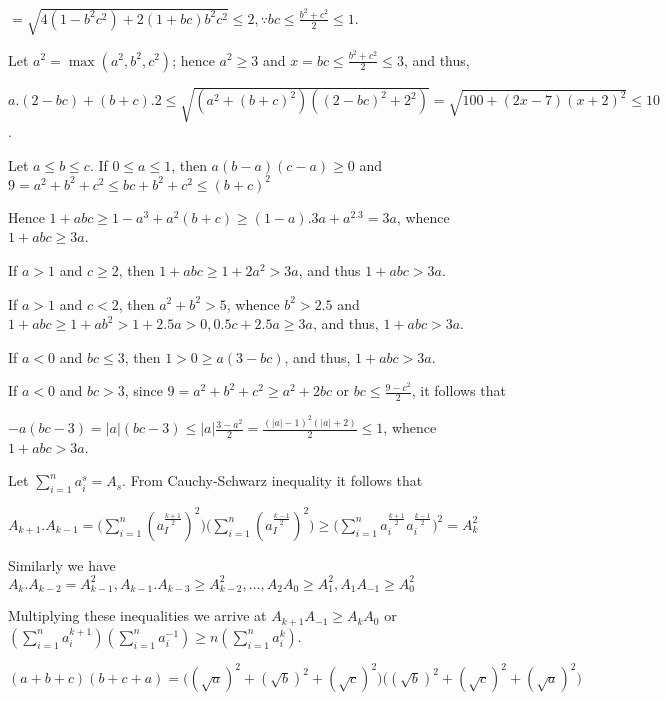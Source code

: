   $= \sqrt{4\left(1 - b^2c^2\right) + 2\left(1 + bc\right)b^2c^2}\leq 2, \because bc\leq \frac{b^2 +
  c^2}{2}\leq 1$.
\item Let $a^2 = \max(a^2, b^2, c^2)$; hence $a^2\geq 3$ and $x = bc \leq \frac{b^2 + c^2}{2}\leq 3$, and
  thus,

  $a.(2 - bc) + (b + c).2\leq \sqrt{\left(a^2 + (b + c)^2\right)\left((2 - bc)^2 + 2^2\right)} = \sqrt{100 +
    (2x - 7)(x + 2)^2}\leq 10$.
\item Let $a\leq b\leq c$. If $0\leq a\leq 1$, then $a(b - a)(c - a)\geq 0$ and $9 = a^2 + b^2 + c^2\leq bc
  + b^2 + c^2\leq (b + c)^2$

  Hence $1 + abc\geq 1 - a^3 + a^2(b + c)\geq (1 - a).3a + a^2.3 = 3a$, whence $1 + abc \geq 3a$.

  If $a > 1$ and $c\geq 2$, then $1 + abc\geq 1 + 2a^2 > 3a$, and thus $1 + abc > 3a$.

  If $a > 1$ and $c < 2$, then $a^2 + b^2 > 5$, whence $b^2 > 2.5$ and $1 + abc\geq 1 + ab^2 > 1 + 2.5a > 0,
  0.5c + 2.5a \geq 3a$, and thus, $1 + abc > 3a$.

  If $a < 0$ and $bc \leq 3$, then $1 > 0\geq a(3 - bc)$, and thus, $1 + abc > 3a$.

  If $a < 0$ and $bc > 3$, since $9 = a^2 + b^2 + c^2\geq a^2 + 2bc$ or $bc \leq \frac{9 - c^2}{2}$, it
  follows that

  $-a(bc - 3) = |a|(bc - 3)\leq |a|\frac{3 - a^2}{2} = \frac{(|a| - 1)^2(|a| + 2)}2{}\leq 1$, whence $1 +
  abc > 3a$.
\item Let $\displaystyle\sum_{i = 1}^na_i^s = A_s$. From Cauchy-Schwarz inequality it follows that

  $A_{k + 1}.A_{k - 1} = \bigl(\displaystyle\sum_{i = 1}^n\left(a_I^{\frac{k +
    1}{2}}\right)^2\bigr)\bigl(\displaystyle\sum_{i = 1}^n\left(a_I^{\frac{k -
    1}{2}}\right)^2\bigr) \geq \bigl(\sum_{i = 1}^na_i^{\frac{k + 1}{2}}a_i^{\frac{k - 1}{2}}\bigr)^2 =
  A_k^2$

  Similarly we have $A_k.A_{k - 2} = A_{k - 1}^2, A_{k - 1}.A_{k - 3}\geq A_{k - 2}^2, \ldots, A_2A_0\geq
  A_1^2, A_1A_{-1}\geq A_0^2$

  Multiplying these inequalities we arrive at $A_{k + 1}A_{-1}\geq A_kA_0$ or
  $\displaystyle\left(\sum_{i=1}^na_i^{k + 1}\right)\left(\sum_{i=1}^na_i^{-1}\right)\geq
  n\left(\sum_{i=1}^na_i^k\right)$.
\item $(a + b + c)(b + c + a) = \bigl(\left(\sqrt{a}\right)^2 + \left(\sqrt{b}\right)^2
  + \left(\sqrt{c}\right)^2\bigr)\bigl(\left(\sqrt{b}\right)^2 +\left(\sqrt{c}\right)^2
  + \left(\sqrt{a}\right)^2\bigr)$

